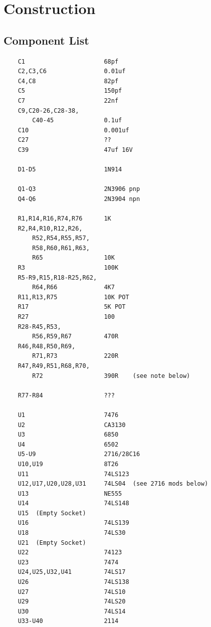 \chapter{Construction}

\section{Component List}

\begin{verbatim}
    C1                      68pf
    C2,C3,C6                0.01uf
    C4,C8                   82pf    
    C5                      150pf 
    C7                      22nf    
    C9,C20-26,C28-38,
        C40-45              0.1uf        
    C10                     0.001uf
    C27                     ??
    C39                     47uf 16V

    D1-D5                   1N914 
    
    Q1-Q3                   2N3906 pnp 
    Q4-Q6                   2N3904 npn 
    
    R1,R14,R16,R74,R76      1K
    R2,R4,R10,R12,R26,
        R52,R54,R55,R57,
        R58,R60,R61,R63,
        R65                 10K     
    R3                      100K 
    R5-R9,R15,R18-R25,R62,
        R64,R66             4K7 
    R11,R13,R75             10K POT 
    R17                     5K POT 
    R27                     100
    R28-R45,R53,
        R56,R59,R67         470R 
    R46,R48,R50,R69,
        R71,R73             220R 
    R47,R49,R51,R68,R70,
        R72                 390R    (see note below)

    R77-R84                 ???
    
    U1                      7476 
    U2                      CA3130 
    U3                      6850 
    U4                      6502 
    U5-U9                   2716/28C16 
    U10,U19                 8T26
    U11                     74LS123
    U12,U17,U20,U28,U31     74LS04  (see 2716 mods below)
    U13                     NE555 
    U14                     74LS148 
    U15  (Empty Socket)
    U16                     74LS139 
    U18                     74LS30 
    U21  (Empty Socket)
    U22                     74123
    U23                     7474 
    U24,U25,U32,U41         74LS17 
    U26                     74LS138 
    U27                     74LS10 
    U29                     74LS20 
    U30                     74LS14 
    U33-U40                 2114 
\end{verbatim}

